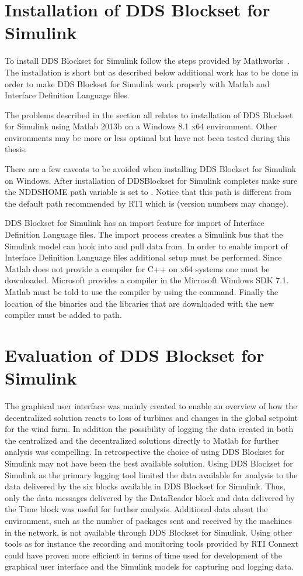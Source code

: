 \section{Installation of DDS Blockset for Simulink}
To install DDS Blockset for Simulink follow the steps provided by Mathworks~\cite{DDSBlocksetPilotSupportPackageUserGuide}. The installation is short but as described below additional work has to be done in order to make DDS Blockset for Simulink work properly with Matlab and Interface Definition Language files.

The problems described in the section all relates to installation of DDS Blockset for Simulink using Matlab 2013b on a Windows 8.1 x64 environment.
Other environments may be more or less optimal but have not been tested during this thesis.

There are a few caveats to be avoided when installing DDS Blockset for Simulink on Windows.
After installation of DDSBlockset for Simulink completes make sure the NDDSHOME path variable is set to .
Notice that this path is different from the default path recommended by RTI which is  (version numbers may change).

DDS Blockset for Simulink has an import feature for import of Interface Definition Language files. The import process creates a Simulink bus that the Simulink model can hook into and pull data from. In order to enable import of Interface Definition Language files additional setup must be performed.
Since Matlab does not provide a compiler for C++ on x64 systems one must be downloaded. Microsoft provides a compiler in the Microsoft Windows SDK 7.1. Matlab must be told to use the compiler by using the  command. Finally the location of the binaries and the libraries that are downloaded with the new compiler must be added to path.

\section{Evaluation of DDS Blockset for Simulink}
The graphical user interface was mainly created to enable an overview of how the decentralized solution reacts to loss of turbines and changes in the global setpoint for the wind farm. In addition the possibility of logging the data created in both the centralized and the decentralized solutions directly to Matlab for further analysis was compelling.
In retrospective the choice of using DDS Blockset for Simulink may not have been the best available solution. Using DDS Blockset for Simulink as the primary logging tool limited the data available for analysis to the data delivered by the six blocks available in DDS Blockset for Simulink.
Thus, only the data messages delivered by the DataReader block and data delivered by the Time block was useful for further analysis. Additional data about the environment, such as the number of packages sent and received by the machines in the network, is not available through DDS Blockset for Simulink.
Using other tools as for instance the recording and monitoring tools provided by RTI Connext could have proven more efficient in terms of time used for development of the graphical user interface and the Simulink models for capturing and logging data.